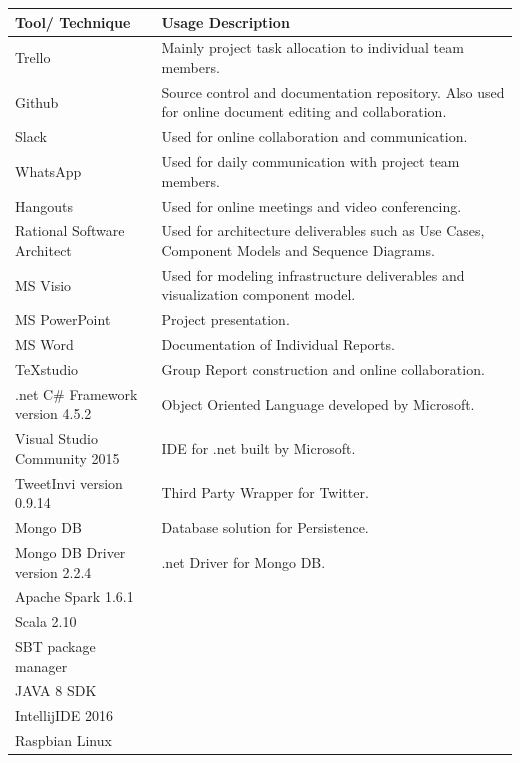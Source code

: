 \documentclass[12pt]{article} %
\begin{document}
	 \begin{center}
	 	\begin{tabular}{ | p{3.5cm} | p{12cm} |}
	 		\hline
	 		\textbf{Tool/ Technique} & \textbf{Usage Description} \\
	 		\hline
	 		Trello & Mainly project task allocation to individual team members.\\
	 		\hline
	 		Github & Source control and documentation repository. Also used for online document editing and collaboration.\\
	 		\hline
	 		Slack & Used for online collaboration and communication.\\
	 		\hline
	 		WhatsApp & Used for daily communication with project team members.\\
	 		\hline
	 		Hangouts & Used for online meetings and video conferencing.\\
	 		\hline
	 		Rational Software Architect & Used for architecture deliverables such as Use Cases, Component Models and Sequence Diagrams.\\
	 		\hline
	 		MS Visio & Used for modeling infrastructure deliverables and visualization component model.\\
	 		\hline
	 		MS PowerPoint & Project presentation.\\
	 		\hline
		 	MS Word & Documentation of Individual Reports.\\
		 	\hline
		 	TeXstudio & Group Report construction and online collaboration.\\
		 	\hline
		 	.net C\# Framework version 4.5.2 & Object Oriented Language developed by Microsoft.\\
		 	\hline
		 	Visual Studio Community 2015 & IDE for .net built by Microsoft.\\
		 	\hline
		 	TweetInvi version 0.9.14 & Third Party Wrapper for Twitter.\\
		 	\hline
		 	Mongo DB & Database solution for Persistence.\\
		 	\hline
		 	Mongo DB Driver version 2.2.4 & .net Driver for Mongo DB.\\
		 	\hline
		 	Apache Spark 1.6.1 & \\
		 	\hline
		 	Scala 2.10 & \\
		 	\hline
		 	SBT package manager & \\
		 	\hline
		 	JAVA 8 SDK & \\
		 	\hline
		 	IntellijIDE 2016 & \\
		 	\hline
		 	Raspbian Linux & \\

\end{tabular}
\end{center}
\end{document}
